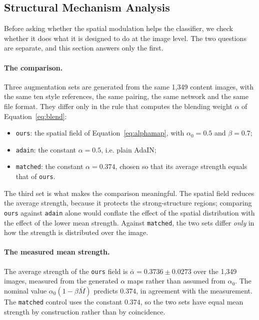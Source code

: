 \subsection{Structural Mechanism Analysis}
\label{sec:mechanism}

Before asking whether the spatial modulation helps the classifier, we check
whether it does what it is designed to do at the image level. The two
questions are separate, and this section answers only the first.

\paragraph{The comparison.}
Three augmentation sets are generated from the same 1{,}349 content images,
with the same ten style references, the same pairing, the same network and
the same file format. They differ only in the rule that computes the
blending weight $\alpha$ of Equation~\eqref{eq:blend}:

\begin{itemize}
\item \texttt{ours}: the spatial field of Equation~\eqref{eq:alphamap}, with
$\alpha_0 = 0.5$ and $\beta = 0.7$;
\item \texttt{adain}: the constant $\alpha = 0.5$, i.e. plain AdaIN;
\item \texttt{matched}: the constant $\alpha = 0.374$, chosen so that its
average strength equals that of \texttt{ours}.
\end{itemize}

The third set is what makes the comparison meaningful. The spatial field
reduces the average strength, because it protects the strong-structure
regions; comparing \texttt{ours} against \texttt{adain} alone would conflate
the effect of the spatial distribution with the effect of the lower mean
strength. Against \texttt{matched}, the two sets differ \emph{only} in how
the strength is distributed over the image.

\paragraph{The measured mean strength.}
The average strength of the \texttt{ours} field is
$\bar{\alpha} = 0.3736 \pm 0.0273$ over the 1{,}349 images, measured from
the generated $\alpha$ maps rather than assumed from $\alpha_0$. The
nominal value $\alpha_0(1-\beta\bar{M})$ predicts $0.374$, in agreement
with the measurement. The \texttt{matched} control uses the constant
$0.374$, so the two sets have equal mean strength by construction rather
than by coincidence.

